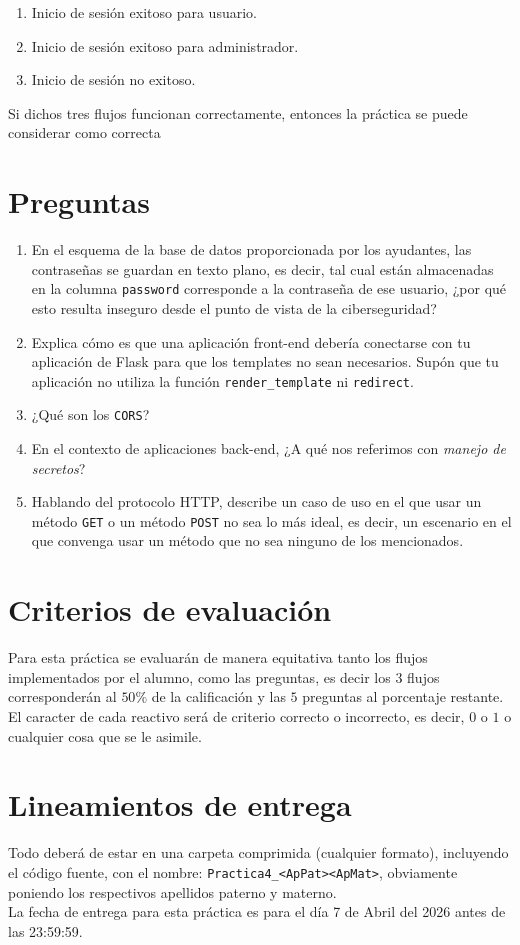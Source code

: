\documentclass{article}
\begin{document}
\begin{enumerate}
    \item Inicio de sesión exitoso para usuario.
    \item Inicio de sesión exitoso para administrador.
    \item Inicio de sesión no exitoso.
\end{enumerate}

Si dichos tres flujos funcionan correctamente, entonces la práctica se puede considerar como correcta 

\section{Preguntas}

\begin{enumerate}
\item En el esquema de la base de datos proporcionada por los ayudantes, las contraseñas se guardan en texto plano, es decir, tal cual están almacenadas en la columna \texttt{password} corresponde a la contraseña de ese usuario, ¿por qué esto resulta inseguro desde el punto de vista de la ciberseguridad?
\item Explica cómo es que una aplicación front-end debería conectarse con tu aplicación de Flask para que los templates no sean necesarios. Supón que tu aplicación no utiliza la función \texttt{render\_template} ni \texttt{redirect}.
\item ¿Qué son los \texttt{CORS}?
\item En el contexto de aplicaciones back-end, ¿A qué nos referimos con \textit{manejo de secretos}?
\item Hablando del protocolo HTTP, describe un caso de uso en el que usar un método \texttt{GET} o un método \texttt{POST} no sea lo más ideal, es decir, un escenario en el que convenga usar un método que no sea ninguno de los mencionados.
\end{enumerate}

\section{Criterios de evaluación}

Para esta práctica se evaluarán de manera equitativa tanto los flujos implementados por el alumno, como las preguntas, es decir los $3$ flujos corresponderán al $50\%$ de la calificación y las $5$ preguntas al porcentaje restante. El caracter de cada reactivo será de criterio correcto o incorrecto, es decir, $0$ o $1$ o cualquier cosa que se le asimile.\\

\section{Lineamientos de entrega}

Todo deberá de estar en una carpeta comprimida (cualquier formato), incluyendo el código fuente, con el nombre: \texttt{Practica4\_<ApPat><ApMat>}, obviamente poniendo los respectivos apellidos paterno y materno.\\ 

La fecha de entrega para esta práctica es para el día 7 de Abril del 2026 antes de las 23:59:59.
\end{document}
